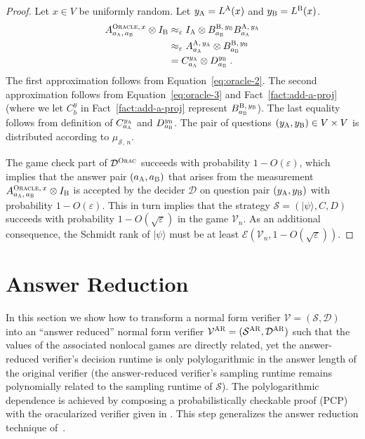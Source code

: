 \documentclass[11pt]{article}
\theoremstyle{definition}
\newcommand{\ket}[1]{|#1\rangle}
\newcommand{\Id}{\ensuremath{I}}
\newcommand{\eps}{\varepsilon}
\newcommand{\sampler}{\mathcal{S}}
\newcommand{\decider}{\mathcal{D}}
\newcommand{\verifier}{\mathcal{V}}
\newcommand{\strategy}{\mathscr{S}}
\newcommand{\gamestyle}[1]{\ensuremath{\textsc{#1}}\xspace}
\newcommand{\ora}{\gamestyle{Orac}}
\newcommand{\ar}{\gamestyle{AR}}
\newcommand{\labelstyle}[1]{\ensuremath{\textsc{#1}}\xspace}
\newcommand{\alice}{\labelstyle{A}}
\newcommand{\bob}{\labelstyle{B}}
\newcommand{\oracle}{\labelstyle{Oracle}}
\newcommand{\Ent}{\mathscr{E}}
\begin{document}
\begin{proof}
  Let $x \in V$ be uniformly random.
  Let $y_\alice = L^\alice(x)$ and $y_\bob =L^\bob(x)$.
  \begin{align*}
    A^{\oracle,\, x}_{a_\alice,\, a_\bob} \otimes \Id_\bob
    & \approx_\eps \Id_\alice \otimes
      B^{\bob,\, y_\bob}_{a_\bob} B^{\alice,\, y_\alice}_{a_\alice} \\
    & \approx_{\eps} A^{\alice,\, y_\alice}_{a_\alice} \otimes
      B^{\bob,\, y_\bob}_{a_\bob} \\
    & = C^{y_\alice}_{a_\alice} \otimes D^{y_\bob}_{a_\bob}\;.
  \end{align*}
	The first approximation follows from Equation~\eqref{eq:oracle-2}.
  The second approximation follows from Equation~\eqref{eq:oracle-3} and
  Fact~\ref{fact:add-a-proj} (where we let $C^y_b$ in Fact~\ref{fact:add-a-proj}
  represent $B^{\bob,\, y_\bob}_{a_\bob}$).
  The last equality follows from definition of $C^{y_\alice}_{a_\alice}$ and
  $D^{y_\bob}_{a_\bob}$.
  The pair of questions $(y_\alice, y_\bob) \in V \times V$ is distributed
  according to $\mu_{\sampler,\, n}$.

  The game check part of $\decider^\ora$ succeeds with probability $1 -
  O(\eps)$, which implies that the answer pair $(a_\alice, a_\bob)$ that arises
  from the measurement $A^{\oracle,\, x}_{a_\alice,\, a_\bob} \otimes \Id_\bob$
  is accepted by the decider $\decider$ on question pair $(y_\alice,y_\bob)$
  with probability $1 - O(\eps)$.
  This in turn implies that the strategy $\strategy = (\ket{\psi},C,D)$ succeeds
  with probability $1 - O(\sqrt{\eps})$ in the game $\verifier_n$.
  As an additional consequence, the Schmidt rank of $\ket{\psi}$ must be at
  least $\Ent(\verifier_n, 1 - O(\sqrt{\eps}))$.
\end{proof}

\section{Answer Reduction}
\label{sec:ans}

In this section we show how to transform a normal form verifier $\verifier =
(\sampler, \decider)$ into an ``answer reduced'' normal form verifier
$\verifier^\ar = (\sampler^\ar, \decider^\ar)$ such that the values of the
associated nonlocal games are directly related, yet the answer-reduced
verifier's decision runtime is only polylogarithmic in the answer length of the
original verifier (the answer-reduced verifier's sampling runtime remains
polynomially related to the sampling runtime of $\sampler$).
The polylogarithmic dependence is achieved by composing a probabilistically
checkable proof (PCP) with the oracularized verifier given in .
This step generalizes the answer reduction technique of~\cite[Part V]{NW19}.
\end{document}
